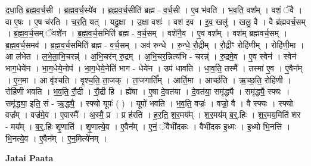 \documentclass[17pt]{extarticle}
\begin{document}
द॒धा॒ति॒ ब्र॒ह्म॒व॒र्च॒सी । ब्र॒ह्म॒व॒र्च॒स्ये॑व । ब्र॒ह्म॒व॒र्च॒सीति॑ ब्रह्म - व॒र्च॒सी । ए॒व भ॑वति । भ॒व॒ति॒ वश᳚म् । वशं॒ ॅवै । वा ए॒षः । ए॒ष च॑रति । च॒र॒ति॒ यत् । यदु॒क्षा । उ॒क्षा वशः॑ । वश॑ इव । इ॒व॒ खलु॑ । खलु॒ वै । वै ब्र॑ह्मवर्च॒सम् । ब्र॒ह्म॒व॒र्च॒सम् ॅवशे॑न । ब्र॒ह्म॒व॒र्च॒समिति॑ ब्रह्म - व॒र्च॒सम् । वशे॑नै॒व । ए॒व वश᳚म् । वश॑म् ब्रह्मवर्च॒सम् । ब्र॒ह्म॒व॒र्च॒समव॑ । ब्र॒ह्म॒व॒र्च॒समिति॑ ब्रह्म - व॒र्च॒सम् । अव॑ रुन्धे । रु॒न्धे॒ रौ॒द्रीम् । रौ॒द्रीꣳ रोहि॑णीम् । रोहि॑णी॒मा । आ ल॑भेत । ल॒भे॒ता॒भि॒चरन्न्॑ । अ॒भि॒चर॑न् रु॒द्रम् । अ॒भि॒चर॒न्नित्य॑भि - चरन्न्॑ । रु॒द्रमे॒व । ए॒व स्वेन॑ । स्वेन॑ भाग॒धेये॑न । भा॒ग॒धेये॒नोप॑ । भा॒ग॒धेये॒नेति॑ भाग - धेये॑न । उप॑ धावति । धा॒व॒ति॒ तस्मै᳚ । तस्मा॑ ए॒व । ए॒वैन᳚म् । ए॒न॒मा । आ वृ॑श्चति । वृ॒श्च॒ति॒ ता॒जक् । ता॒जगार्ति᳚म् । आर्ति॒मा । आर्च्छ॑ति । ऋ॒च्छ॒ति॒ रोहि॑णी । रोहि॑णी भवति । भ॒व॒ति॒ रौ॒द्री । रौ॒द्री हि । ह्ये॑षा । ए॒षा दे॒वत॑या । दे॒वत॑या॒ समृ॑द्ध्यै । समृ॑द्ध्यै॒ स्फ्यः । समृ॑द्ध्या॒ इति॒ सं - ऋ॒द्ध्यै॒ । स्फ्यो यूपः॑ ( ) । यूपो॑ भवति । भ॒व॒ति॒ वज्रः॑ । वज्रो॒ वै । वै स्फ्यः । स्फ्यो वज्र᳚म् । वज्र॑मे॒व । ए॒वास्मै᳚ । अ॒स्मै॒ प्र । प्र ह॑रति । ह॒र॒ति॒ श॒र॒मय᳚म् । श॒र॒मय॑म् ब॒र्॒.हिः । श॒र॒मय॒मिति॑ शर - मय᳚म् । ब॒र्॒.हिः शृ॒णाति॑ । शृ॒णात्ये॒व । ए॒वैन᳚म् । ए॒नं॒ ॅवैभी॑दकः । वैभी॑दक इ॒ध्मः । इ॒ध्मो भि॒नत्ति॑ । भि॒नत्ये॒व । ए॒वैन᳚म् । ए॒न॒मित्ये॑नम् । \newline

\textbf{Jatai Paata} \newline
\end{document}
